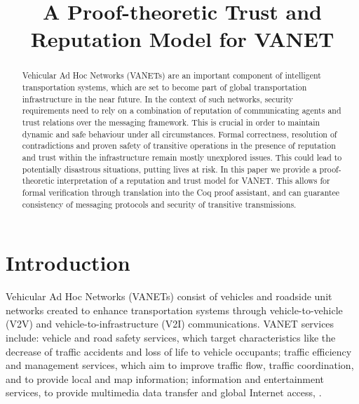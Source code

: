 \documentclass[compsoc, conference, letterpaper, 10pt, times]{IEEEtran}
\begin{document}
\title{A Proof-theoretic Trust and Reputation Model for VANET}


\author{
	}


\maketitle

\begin{abstract}
Vehicular Ad Hoc Networks (VANETs) are an important component of intelligent transportation systems, which are set to become part of global transportation infrastructure in the near future. In the context of such networks, security requirements need to rely on a combination of reputation of communicating agents and trust relations over the messaging framework. This is crucial in order to maintain dynamic and safe behaviour under all circumstances. Formal correctness, resolution of contradictions and proven safety of transitive operations in the presence of reputation and trust within the infrastructure remain mostly unexplored issues. This could lead to potentially disastrous situations, putting lives at risk. In this paper we provide a proof-theoretic interpretation of a reputation and trust model for VANET. This allows for formal verification through translation into the Coq proof assistant, and can guarantee consistency of messaging protocols and security of transitive transmissions.
\end{abstract}


\section{Introduction}\label{sec:intro}

Vehicular Ad Hoc Networks (VANETs) consist of vehicles and roadside unit networks created to enhance transportation systems through vehicle-to-vehicle (V2V) and vehicle-to-infrastructure (V2I) communications. VANET services include: vehicle and road safety services, which target characteristics like the decrease of traffic accidents and loss of life to vehicle occupants; traffic efficiency and management services, which aim to improve traffic flow, traffic coordination, and to provide local and map information; information and entertainment services, to provide multimedia data transfer and global Internet access, \cite{6849111}. 
\end{document}
